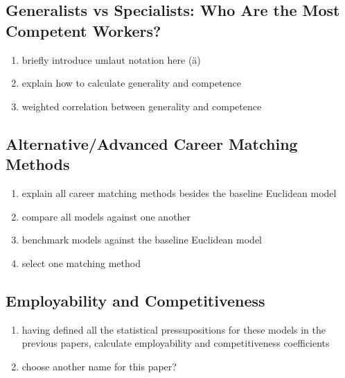 \documentclass{elsarticle} %
\begin{document}

\subsection{Generalists vs Specialists: Who Are the Most Competent Workers?}
\begin{enumerate}
    \item briefly introduce umlaut notation here (ä)
    \item explain how to calculate generality and competence
    \item weighted correlation between generality and competence
\end{enumerate}

\subsection{Alternative/Advanced Career Matching Methods}
\begin{enumerate}
    \item explain all career matching methods besides the baseline Euclidean model
    \item compare all models against one another
    \item benchmark models against the baseline Euclidean model
    \item select one matching method
\end{enumerate}

\subsection{Employability and Competitiveness}
\begin{enumerate}
    \item having defined all the statistical pressupositions for these models in the
          previous papers, calculate employability and competitiveness coefficients
    \item choose another name for this paper?
\end{enumerate}
\end{document}
